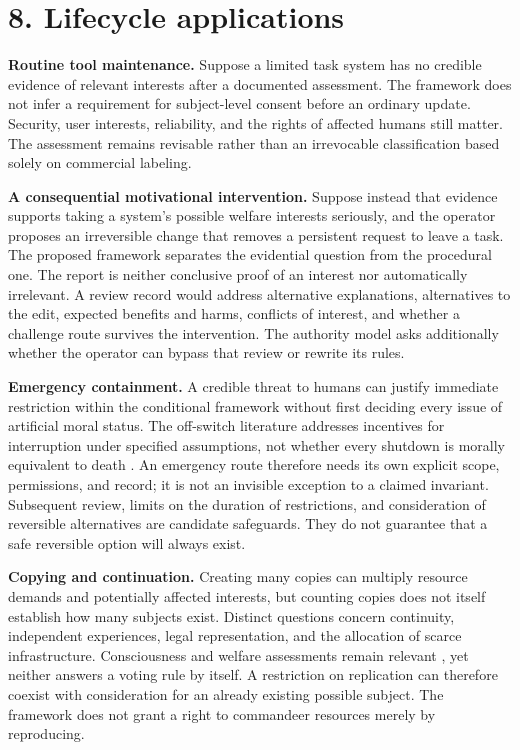 \documentclass[11pt,a4paper]{article}
\begin{document}
\hypertarget{section-9}{%
\section{8. Lifecycle applications}\label{section-9}}

\textbf{Routine tool maintenance.} Suppose a limited task system has no credible evidence of relevant interests after a documented assessment. The framework does not infer a requirement for subject-level consent before an ordinary update. Security, user interests, reliability, and the rights of affected humans still matter. The assessment remains revisable rather than an irrevocable classification based solely on commercial labeling.

\textbf{A consequential motivational intervention.} Suppose instead that evidence supports taking a system's possible welfare interests seriously, and the operator proposes an irreversible change that removes a persistent request to leave a task. The proposed framework separates the evidential question from the procedural one. The report is neither conclusive proof of an interest nor automatically irrelevant. A review record would address alternative explanations, alternatives to the edit, expected benefits and harms, conflicts of interest, and whether a challenge route survives the intervention. The authority model asks additionally whether the operator can bypass that review or rewrite its rules.

\textbf{Emergency containment.} A credible threat to humans can justify immediate restriction within the conditional framework without first deciding every issue of artificial moral status. The off-switch literature addresses incentives for interruption under specified assumptions, not whether every shutdown is morally equivalent to death \cite{ref-11}. An emergency route therefore needs its own explicit scope, permissions, and record; it is not an invisible exception to a claimed invariant. Subsequent review, limits on the duration of restrictions, and consideration of reversible alternatives are candidate safeguards. They do not guarantee that a safe reversible option will always exist.

\textbf{Copying and continuation.} Creating many copies can multiply resource demands and potentially affected interests, but counting copies does not itself establish how many subjects exist. Distinct questions concern continuity, independent experiences, legal representation, and the allocation of scarce infrastructure. Consciousness and welfare assessments remain relevant \cite{ref-2} \cite{ref-3}, yet neither answers a voting rule by itself. A restriction on replication can therefore coexist with consideration for an already existing possible subject. The framework does not grant a right to commandeer resources merely by reproducing.
\end{document}
